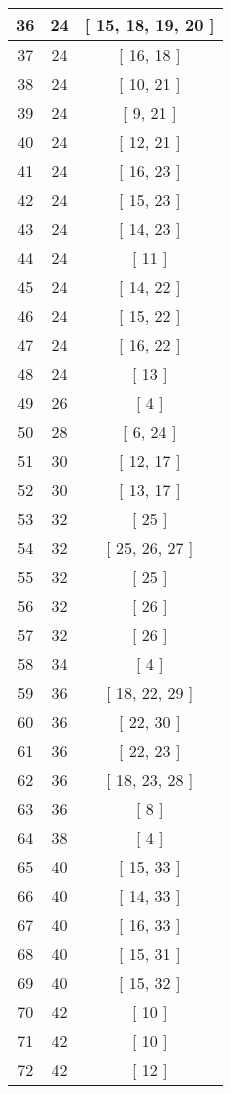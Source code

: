 \begin{center}
\begin{longtable}[H]{|| c c c ||}
\hline
36 & 24 & [ 15, 18, 19, 20 ] \\ 
\hline
37 & 24 & [ 16, 18 ] \\ 
\hline
38 & 24 & [ 10, 21 ] \\ 
\hline
39 & 24 & [ 9, 21 ] \\ 
\hline
40 & 24 & [ 12, 21 ] \\ 
\hline
41 & 24 & [ 16, 23 ] \\ 
\hline
42 & 24 & [ 15, 23 ] \\ 
\hline
43 & 24 & [ 14, 23 ] \\ 
\hline
44 & 24 & [ 11 ] \\ 
\hline
45 & 24 & [ 14, 22 ] \\ 
\hline
46 & 24 & [ 15, 22 ] \\ 
\hline
47 & 24 & [ 16, 22 ] \\ 
\hline
48 & 24 & [ 13 ] \\ 
\hline
49 & 26 & [ 4 ] \\ 
\hline
50 & 28 & [ 6, 24 ] \\ 
\hline
51 & 30 & [ 12, 17 ] \\ 
\hline
52 & 30 & [ 13, 17 ] \\ 
\hline
53 & 32 & [ 25 ] \\ 
\hline
54 & 32 & [ 25, 26, 27 ] \\ 
\hline
55 & 32 & [ 25 ] \\ 
\hline
56 & 32 & [ 26 ] \\ 
\hline
57 & 32 & [ 26 ] \\ 
\hline
58 & 34 & [ 4 ] \\ 
\hline
59 & 36 & [ 18, 22, 29 ] \\ 
\hline
60 & 36 & [ 22, 30 ] \\ 
\hline
61 & 36 & [ 22, 23 ] \\ 
\hline
62 & 36 & [ 18, 23, 28 ] \\ 
\hline
63 & 36 & [ 8 ] \\ 
\hline
64 & 38 & [ 4 ] \\ 
\hline
65 & 40 & [ 15, 33 ] \\ 
\hline
66 & 40 & [ 14, 33 ] \\ 
\hline
67 & 40 & [ 16, 33 ] \\ 
\hline
68 & 40 & [ 15, 31 ] \\ 
\hline
69 & 40 & [ 15, 32 ] \\ 
\hline
70 & 42 & [ 10 ] \\ 
\hline
71 & 42 & [ 10 ] \\ 
\hline
72 & 42 & [ 12 ] \\ 

\end{longtable}
\end{center}
